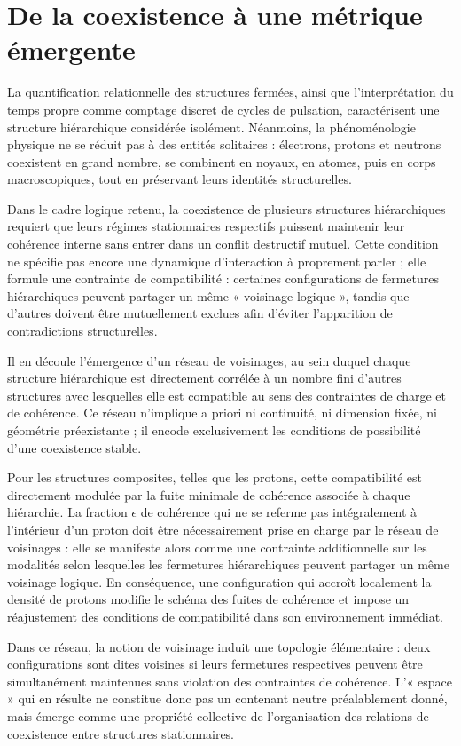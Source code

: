 \documentclass[11pt,a4paper]{article}
\begin{document}
\section{De la coexistence à une métrique émergente}

La quantification relationnelle des structures fermées, ainsi que l’interprétation du temps propre comme comptage discret de cycles de pulsation, caractérisent une structure hiérarchique considérée isolément. Néanmoins, la phénoménologie physique ne se réduit pas à des entités solitaires : électrons, protons et neutrons coexistent en grand nombre, se combinent en noyaux, en atomes, puis en corps macroscopiques, tout en préservant leurs identités structurelles.

Dans le cadre logique retenu, la coexistence de plusieurs structures hiérarchiques requiert que leurs régimes stationnaires respectifs puissent maintenir leur cohérence interne sans entrer dans un conflit destructif mutuel. Cette condition ne spécifie pas encore une dynamique d’interaction à proprement parler ; elle formule une contrainte de compatibilité : certaines configurations de fermetures hiérarchiques peuvent partager un même « voisinage logique », tandis que d’autres doivent être mutuellement exclues afin d’éviter l’apparition de contradictions structurelles.

Il en découle l’émergence d’un réseau de voisinages, au sein duquel chaque structure hiérarchique est directement corrélée à un nombre fini d’autres structures avec lesquelles elle est compatible au sens des contraintes de charge et de cohérence. Ce réseau n’implique a priori ni continuité, ni dimension fixée, ni géométrie préexistante ; il encode exclusivement les conditions de possibilité d’une coexistence stable.

Pour les structures composites, telles que les protons, cette compatibilité est directement modulée par la fuite minimale de cohérence associée à chaque hiérarchie. La fraction \(\epsilon\) de cohérence qui ne se referme pas intégralement à l’intérieur d’un proton doit être nécessairement prise en charge par le réseau de voisinages : elle se manifeste alors comme une contrainte additionnelle sur les modalités selon lesquelles les fermetures hiérarchiques peuvent partager un même voisinage logique. En conséquence, une configuration qui accroît localement la densité de protons modifie le schéma des fuites de cohérence et impose un réajustement des conditions de compatibilité dans son environnement immédiat.

Dans ce réseau, la notion de voisinage induit une topologie élémentaire : deux configurations sont dites voisines si leurs fermetures respectives peuvent être simultanément maintenues sans violation des contraintes de cohérence. L’« espace » qui en résulte ne constitue donc pas un contenant neutre préalablement donné, mais émerge comme une propriété collective de l’organisation des relations de coexistence entre structures stationnaires.
\end{document}
